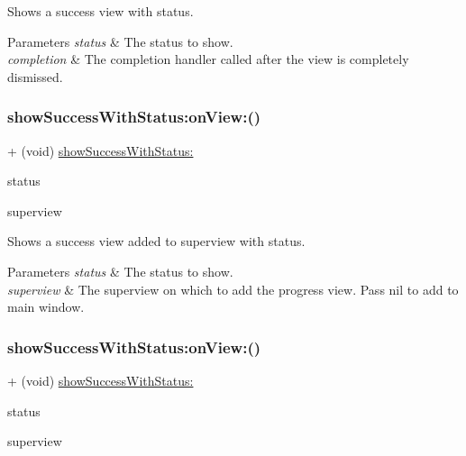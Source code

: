 Shows a success view with {\ttfamily status}. 
\begin{DoxyParams}{Parameters}
{\em status} & The status to show. \\
\hline
{\em completion} & The completion handler called after the view is completely dismissed. \\
\hline
\end{DoxyParams}
\mbox{\label{interface_k_v_n_progress_a86fcdede3818f360abfae851a7b1b7fc}} 
\subsubsection{\texorpdfstring{show\+Success\+With\+Status\+:on\+View\+:()}{showSuccessWithStatus:onView:()}\hspace{0.1cm}{\footnotesize\ttfamily [1/3]}}
{\footnotesize\ttfamily + (void) \mbox{\hyperlink{interface_k_v_n_progress_ae9b8b57302f6a4456658e758784790bf}{show\+Success\+With\+Status\+:}} \begin{DoxyParamCaption}\item[{(N\+S\+String $\ast$)}]{status }\item[{onView:(U\+I\+View $\ast$)}]{superview }\end{DoxyParamCaption}}

Shows a success view added to {\ttfamily superview} with {\ttfamily status}. 
\begin{DoxyParams}{Parameters}
{\em status} & The status to show. \\
\hline
{\em superview} & The superview on which to add the progress view. Pass {\ttfamily nil} to add to main window. \\
\hline
\end{DoxyParams}
\mbox{\label{interface_k_v_n_progress_a86fcdede3818f360abfae851a7b1b7fc}} 
\subsubsection{\texorpdfstring{show\+Success\+With\+Status\+:on\+View\+:()}{showSuccessWithStatus:onView:()}\hspace{0.1cm}{\footnotesize\ttfamily [2/3]}}
{\footnotesize\ttfamily + (void) \mbox{\hyperlink{interface_k_v_n_progress_ae9b8b57302f6a4456658e758784790bf}{show\+Success\+With\+Status\+:}} \begin{DoxyParamCaption}\item[{(N\+S\+String $\ast$)}]{status }\item[{onView:(U\+I\+View $\ast$)}]{superview }\end{DoxyParamCaption}}

